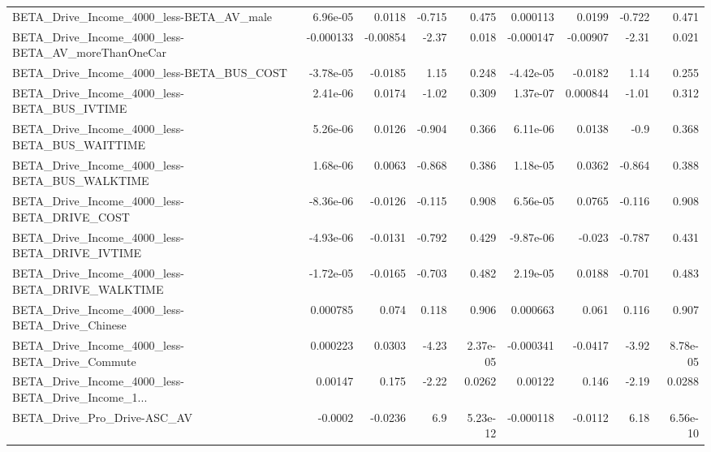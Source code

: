 \begin{tabular}{lrrrrrrrr}
BETA\_Drive\_Income\_4000\_less-BETA\_AV\_male           &    6.96e-05 &       0.0118 &    -0.715 &    0.475 &   0.000113 &      0.0199 &       -0.722 &         0.471 \\
BETA\_Drive\_Income\_4000\_less-BETA\_AV\_moreThanOneCar &   -0.000133 &     -0.00854 &     -2.37 &    0.018 &  -0.000147 &    -0.00907 &        -2.31 &         0.021 \\
BETA\_Drive\_Income\_4000\_less-BETA\_BUS\_COST          &   -3.78e-05 &      -0.0185 &      1.15 &    0.248 &  -4.42e-05 &     -0.0182 &         1.14 &         0.255 \\
BETA\_Drive\_Income\_4000\_less-BETA\_BUS\_IVTIME        &    2.41e-06 &       0.0174 &     -1.02 &    0.309 &   1.37e-07 &    0.000844 &        -1.01 &         0.312 \\
BETA\_Drive\_Income\_4000\_less-BETA\_BUS\_WAITTIME      &    5.26e-06 &       0.0126 &    -0.904 &    0.366 &   6.11e-06 &      0.0138 &         -0.9 &         0.368 \\
BETA\_Drive\_Income\_4000\_less-BETA\_BUS\_WALKTIME      &    1.68e-06 &       0.0063 &    -0.868 &    0.386 &   1.18e-05 &      0.0362 &       -0.864 &         0.388 \\
BETA\_Drive\_Income\_4000\_less-BETA\_DRIVE\_COST        &   -8.36e-06 &      -0.0126 &    -0.115 &    0.908 &   6.56e-05 &      0.0765 &       -0.116 &         0.908 \\
BETA\_Drive\_Income\_4000\_less-BETA\_DRIVE\_IVTIME      &   -4.93e-06 &      -0.0131 &    -0.792 &    0.429 &  -9.87e-06 &      -0.023 &       -0.787 &         0.431 \\
BETA\_Drive\_Income\_4000\_less-BETA\_DRIVE\_WALKTIME    &   -1.72e-05 &      -0.0165 &    -0.703 &    0.482 &   2.19e-05 &      0.0188 &       -0.701 &         0.483 \\
BETA\_Drive\_Income\_4000\_less-BETA\_Drive\_Chinese     &    0.000785 &        0.074 &     0.118 &    0.906 &   0.000663 &       0.061 &        0.116 &         0.907 \\
BETA\_Drive\_Income\_4000\_less-BETA\_Drive\_Commute     &    0.000223 &       0.0303 &     -4.23 & 2.37e-05 &  -0.000341 &     -0.0417 &        -3.92 &      8.78e-05 \\
BETA\_Drive\_Income\_4000\_less-BETA\_Drive\_Income\_1... &     0.00147 &        0.175 &     -2.22 &   0.0262 &    0.00122 &       0.146 &        -2.19 &        0.0288 \\
BETA\_Drive\_Pro\_Drive-ASC\_AV                        &     -0.0002 &      -0.0236 &       6.9 & 5.23e-12 &  -0.000118 &     -0.0112 &         6.18 &      6.56e-10 \\

\end{tabular}
